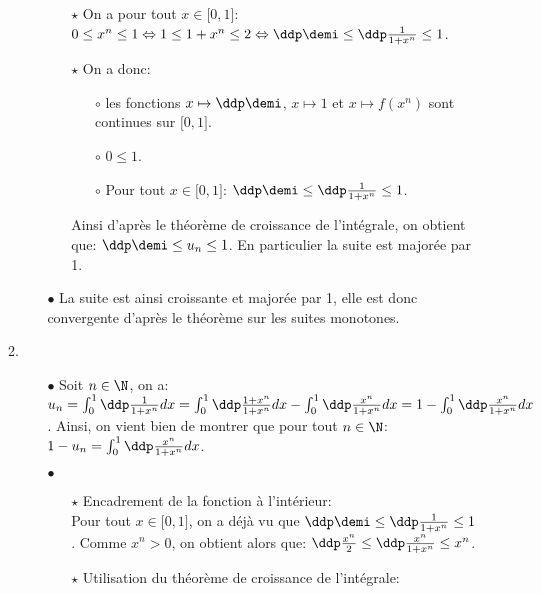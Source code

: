 \documentclass[a4paper, 11pt,reqno]{article}
\begin{document}
\begin{correction}
\begin{enumerate}
\begin{enumerate}
\begin{itemize}
				                  \begin{itemize}
					                  \item[$\star$] On a pour tout $x\in\lbrack 0,1\rbrack$: $0\leq x^n\leq 1\Leftrightarrow 1\leq 1+x^n \leq 2\Leftrightarrow \ddp\demi \leq \ddp\frac{1}{1+x^n} \leq 1$.
					                  \item[$\star$] On a donc:
					                        \begin{itemize}
						                        \item[$\circ$] les fonctions $x\mapsto \ddp\demi$, $x\mapsto 1$ et $x\mapsto f(x^n)$ sont continues sur $\lbrack 0,1\rbrack$.
						                        \item[$\circ$] $0\leq 1$.
						                        \item[$\circ$] Pour tout $x\in\lbrack 0,1\rbrack$: $\ddp\demi \leq \ddp\frac{1}{1+x^n} \leq 1$.
					                        \end{itemize}
					                        Ainsi d'apr\`{e}s le th\'eor\`{e}me de croissance de l'int\'egrale, on obtient que: $\ddp\demi \leq u_n\leq 1$. En particulier la suite est major\'ee par 1.
				                  \end{itemize}
				            \item[$\bullet$] La suite est ainsi croissante et major\'ee par 1, elle est donc convergente d'apr\`{e}s le th\'eor\`{e}me sur les suites monotones.
			            \end{itemize}
			      \item
			            \begin{itemize}
				            \item[$\bullet$] Soit $n\in\N$, on a: $u_n=\int_0^1 \ddp\frac{1}{1+x^n}dx = \int_0^1 \ddp\frac{1+x^n}{1+x^n}dx-\int_0^1 \ddp\frac{x^n}{1+x^n}dx=1-\int_0^1 \ddp\frac{x^n}{1+x^n}dx$. Ainsi, on vient bien de montrer que pour tout $n\in\N$: $1-u_n=\int_0^1 \ddp\frac{x^n}{1+x^n}dx$.
				            \item[$\bullet$]
				                  \begin{itemize}
					                  \item[$\star$] Encadrement de la fonction \`{a} l'int\'erieur:\\
					                        \noindent Pour tout $x\in\lbrack 0,1\rbrack$, on a d\'ej\`{a} vu que $\ddp\demi \leq \ddp\frac{1}{1+x^n} \leq 1$. Comme $x^n>0$, on obtient alors que: $\ddp\frac{x^n}{2}\leq \ddp\frac{x^n}{1+x^n}\leq x^n$.
					                  \item[$\star$] Utilisation du th\'eor\`{e}me de croissance de l'int\'egrale:

\end{itemize}
\end{itemize}
\end{enumerate}
\end{enumerate}
\end{correction}
\end{document}
